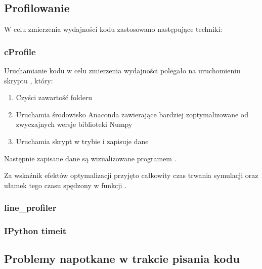 \subsection{Profilowanie}
W celu zmierzenia wydajności kodu zastosowano następujące techniki:
\subsubsection{cProfile}
Uruchamianie kodu w celu zmierzenia wydajności polegało na uruchomieniu skryptu , który:
\begin{enumerate}
\item Czyści zawartość folderu 
\item Uruchamia środowisko Anaconda zawierające bardziej zoptymalizowane od zwyczajnych wersje biblioteki Numpy
\item Uruchamia skrypt  w trybie  i zapisuje dane
\end{enumerate}

Następnie zapisane dane są wizualizowane programem .

Za wskaźnik efektów optymalizacji przyjęto całkowity czas trwania symulacji oraz ułamek tego czasu spędzony w funkcji
.
\subsubsection{line\_profiler}
\subsubsection{IPython timeit}

\subsection{Problemy napotkane w trakcie pisania kodu} %
